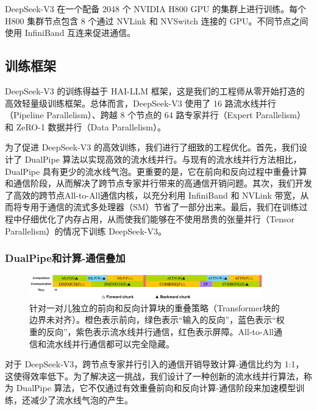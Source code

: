 \documentclass[lang=cn,a4paper,newtx]{elegantpaper}
\newcommand{\dsviii}{DeepSeek-V3}
\begin{document}
\dsviii{} 在一个配备 2048 个 NVIDIA H800 GPU 的集群上进行训练。每个 H800 集群节点包含 8 个通过 NVLink 和 NVSwitch 连接的 GPU。不同节点之间使用 InfiniBand 互连来促进通信。

\subsection{训练框架}

\dsviii{} 的训练得益于 HAI-LLM 框架，这是我们的工程师从零开始打造的高效轻量级训练框架。总体而言，\dsviii{} 使用了 16 路流水线并行（Pipeline Parallelism）、跨越 8 个节点的 64 路专家并行（Expert Parallelism）和 ZeRO-1 数据并行（Data Parallelism）。

为了促进 \dsviii{} 的高效训练，我们进行了细致的工程优化。首先，我们设计了 DualPipe 算法以实现高效的流水线并行。与现有的流水线并行方法相比，DualPipe 具有更少的流水线气泡。更重要的是，它在前向和反向过程中重叠计算和通信阶段，从而解决了跨节点专家并行带来的高通信开销问题。其次，我们开发了高效的跨节点All-to-All通信内核，以充分利用 InfiniBand 和 NVLink 带宽，从而将专用于通信的流式多处理器（SM）节省了一部分出来。最后，我们在训练过程中仔细优化了内存占用，从而使我们能够在不使用昂贵的张量并行（Tensor Parallelism）的情况下训练 \dsviii{}。

\subsubsection{DualPipe和计算-通信叠加}

\begin{figure}[t]
    \centering
    \includegraphics[width=0.9\textwidth]{figures/overlap.pdf}
    \caption{针对一对儿独立的前向和反向计算块的重叠策略（Transformer块的边界未对齐）。橙色表示前向，绿色表示“输入的反向”，蓝色表示“权重的反向”，紫色表示流水线并行通信，红色表示屏障。All-to-All通信和流水线并行通信都可以完全隐藏。
    }
    \label{fig:transformer-overlap}
\end{figure}

对于 \dsviii{}，跨节点专家并行引入的通信开销导致计算-通信比约为 1:1，这使得效率低下。为了解决这一挑战，我们设计了一种创新的流水线并行算法，称为 DualPipe 算法，它不仅通过有效重叠前向和反向计算-通信阶段来加速模型训练，还减少了流水线气泡的产生。
\end{document}
